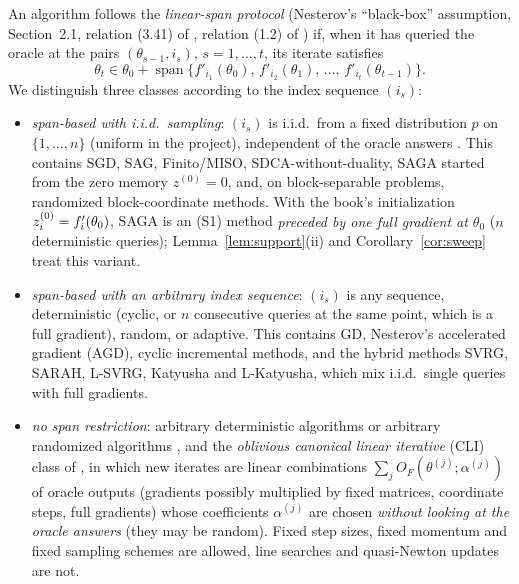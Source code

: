 \begin{definition}
\label{def:span}
An algorithm follows the \emph{linear-span protocol} (Nesterov's ``black-box'' assumption, \cite{nesterov2018lectures} Section~2.1, relation (3.41) of \cite{lan2018optimal}, relation (1.2) of \cite{hannah2018breaking}) if, when it has queried the oracle at the pairs $(\theta_{s-1},i_s)$, $s=1,\dots,t$, its iterate satisfies
\begin{equation}
\label{eq:span}
\theta_t\in\theta_0+\operatorname{span}\big\{f'_{i_1}(\theta_0),\,f'_{i_2}(\theta_1),\,\dots,\,f'_{i_t}(\theta_{t-1})\big\}.
\end{equation}
We distinguish three classes according to the index sequence $(i_s)$:
\begin{itemize}[nosep]
\item[(S1)] \emph{span-based with i.i.d.\ sampling}: $(i_s)$ is i.i.d.\ from a fixed distribution $p$ on $\{1,\dots,n\}$ (uniform in the project), independent of the oracle answers \cite{lan2018optimal,hannah2018breaking}. This contains SGD, SAG, Finito/MISO, SDCA-without-duality, SAGA started from the zero memory $z^{(0)}=0$, and, on block-separable problems, randomized block-coordinate methods. With the book's initialization $z_i^{(0)}=f'_i(\theta_0)$, SAGA is an (S1) method \emph{preceded by one full gradient at $\theta_0$} ($n$ deterministic queries); Lemma~\ref{lem:support}(ii) and Corollary~\ref{cor:sweep} treat this variant.
\item[(S2)] \emph{span-based with an arbitrary index sequence}: $(i_s)$ is any sequence, deterministic (cyclic, or $n$ consecutive queries at the same point, which is a full gradient), random, or adaptive. This contains GD, Nesterov's accelerated gradient (AGD), cyclic incremental methods, and the hybrid methods SVRG, SARAH, L-SVRG, Katyusha and L-Katyusha, which mix i.i.d.\ single queries with full gradients.
\item[(S3)] \emph{no span restriction}: arbitrary deterministic algorithms \cite{agarwal2015lower,woodworth2016tight} or arbitrary randomized algorithms \cite{woodworth2016tight}, and the \emph{oblivious canonical linear iterative} (CLI) class of \cite{arjevani2016dimension}, in which new iterates are linear combinations $\sum_j O_F(\theta^{(j)};\alpha^{(j)})$ of oracle outputs (gradients possibly multiplied by fixed matrices, coordinate steps, full gradients) whose coefficients $\alpha^{(j)}$ are chosen \emph{without looking at the oracle answers} (they may be random). Fixed step sizes, fixed momentum and fixed sampling schemes are allowed, line searches and quasi-Newton updates are not.
\end{itemize}
\end{definition}

